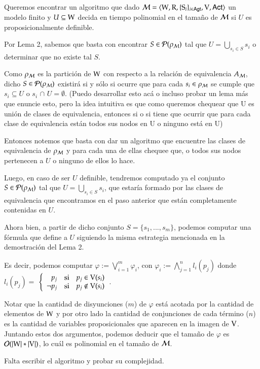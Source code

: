 \begin{demostracion}
    Queremos encontrar un algoritmo que dado $\mathcal{M}=\langle \mathrm{W},\mathrm{R},\{ \mathrm{S}_i \}_{i \in {\rm \sf Agt}},\mathrm{V},{\rm \sf Act} \rangle$ un modelo finito y $U \subseteq \mathrm{W}$ decida en tiempo polinomial en el tamaño de $\mathcal{M}$ si $U$ es proposicionalmente definible.

    Por Lema 2, sabemos que basta con encontrar $S \in \mathcal{P}(\rho_{\mathcal{M}})$ tal que $U = \bigcup\limits_{s_i \in S} s_{i}$ o determinar que no existe tal $S$.
    
    Como $\rho_{\mathcal{M}}$ es la partición de $\mathrm{W}$ con respecto a la relación de equivalencia $A_{\mathcal{M}}$, dicho $S \in \mathcal{P}(\rho_{\mathcal{M}})$ existirá si y sólo si ocurre que para cada $s_i \in \rho_{\mathcal{M}}$ se cumple que $s_i \subseteq U$ o $s_i$ $\cap$ $U = \emptyset$. (Puedo desarrollar esto acá o incluso probar un lema más que enuncie esto, pero la idea intuitiva es que como queremos chequear que U es unión de clases de equivalencia, entonces si o si tiene que ocurrir que para cada clase de equivalencia están todos sus nodos en U o ninguno está en U)

    Entonces notemos que basta con dar un algoritmo que encuentre las clases de equivalencia de $\rho_{\mathcal{M}}$ y para cada una de ellas chequee que, o todos sus nodos pertenecen a $U$ o ninguno de ellos lo hace.


    


        

    Luego, en caso de ser $U$ definible, tendremos computado ya el conjunto $S \in \mathcal{P}(\rho_{\mathcal{M}})$ tal que $U = \bigcup\limits_{s_i \in S} s_{i}$, que estaría formado por las clases de equivalencia que encontramos en el paso anterior que están completamente contenidas en $U$.

    Ahora bien, a partir de dicho conjunto $S = \{s_1,...,s_m\}$, podemos computar una fórmula que define a $U$ siguiendo la misma estrategia mencionada en la demostración del Lema 2. 
    
    Es decir, podemos computar $\varphi := \bigvee\limits_{i = 1}^{m}\varphi_i$, con $\varphi_i := \bigwedge\limits_{j = 1}^{n} l_i(p_j)$ donde $l_i(p_j) = $
        $\left\{ \begin{array}{rcl}
                p_j & \mbox{si}
                & p_j \in \mathrm{V}(s_i) \\ \neg p_j & \mbox{si} & p_j \notin \mathrm{V}(s_i) \\
                \end{array}\right.
        $.

    Notar que la cantidad de disyunciones ($m$) de $\varphi$ está acotada por la cantidad de elementos de $\mathrm{W}$ y por otro lado la cantidad de conjunciones de cada término ($n$) es la cantidad de variables proposicionales que aparecen en la imagen de $\mathrm{V}$. Juntando estos dos argumentos, podemos deducir que el tamaño de $\varphi$ es $\mathcal{O}(|\mathrm{W}| *|\mathrm{V}|)$, lo cuál es polinomial en el tamaño de $\mathcal{M}$.

    Falta escribir el algoritmo y probar su complejidad.
\end{demostracion}


